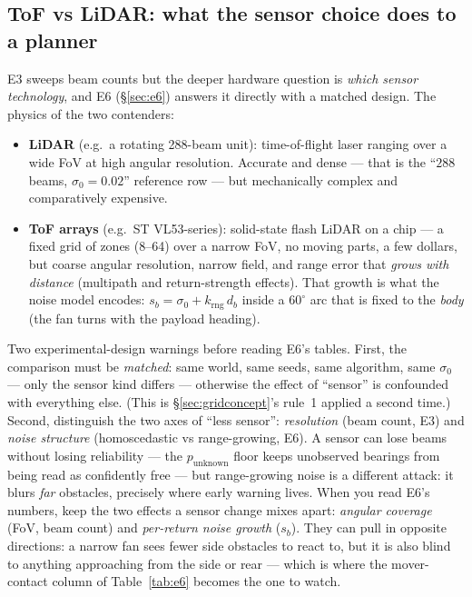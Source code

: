 \subsection{ToF vs LiDAR: what the sensor choice does to a planner}
\label{sec:concept-tof}

E3 sweeps beam counts but the deeper hardware question is \emph{which
sensor technology}, and E6 (\S\ref{sec:e6}) answers it directly with a
matched design. The physics of the two contenders:

\begin{itemize}[leftmargin=1.6em]
\item \textbf{LiDAR} (e.g.\ a rotating 288-beam unit): time-of-flight laser
ranging over a wide FoV at high angular resolution. Accurate and dense
--- that is the ``$288$ beams, $\sigma_0 = 0.02$'' reference row --- but
mechanically complex and comparatively expensive.
\item \textbf{ToF arrays} (e.g.\ ST VL53-series): solid-state flash LiDAR
on a chip --- a fixed grid of zones (8--64) over a narrow FoV, no moving
parts, a few dollars, but coarse angular resolution, narrow field, and
range error that \emph{grows with distance} (multipath and return-strength
effects). That growth is what the  noise model encodes:
$s_b = \sigma_0 + k_{\mathrm{rng}}\, d_b$ inside a $60^\circ$ arc that is
fixed to the \emph{body} (the fan turns with the payload heading).
\end{itemize}

Two experimental-design warnings before reading E6's tables. First, the
comparison must be \emph{matched}: same world, same seeds, same algorithm,
same $\sigma_0$ --- only the sensor kind differs --- otherwise the effect of
``sensor'' is confounded with everything else. (This is
\S\ref{sec:gridconcept}'s rule~1 applied a second time.) Second, distinguish
the two axes of ``less sensor'': \emph{resolution} (beam count, E3) and
\emph{noise structure} (homoscedastic vs range-growing, E6). A sensor can
lose beams without losing reliability --- the $p_{\mathrm{unknown}}$
floor keeps unobserved bearings from being read as confidently free --- but
range-growing noise is a different attack: it blurs \emph{far} obstacles,
precisely where early warning lives. When you read E6's numbers, keep the
two effects a sensor change mixes apart: \emph{angular coverage} (FoV, beam
count) and \emph{per-return noise growth} ($s_b$). They can pull in opposite
directions: a narrow fan sees fewer side obstacles to react to, but it is
also blind to anything approaching from the side or rear --- which is where
the mover-contact column of Table~\ref{tab:e6} becomes the one to watch.

